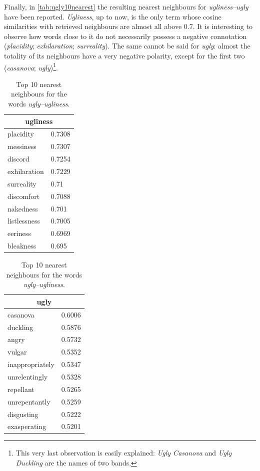 Finally, in \autoref{tab:ugly10nearest} the resulting nearest neighbours for \emph{ugliness--ugly} have been reported. \emph{Ugliness}, up to now, is the only term whose cosine similarities with retrieved neighbours are almost all above 0.7. It is interesting to observe how words close to it do not necessarily possess a negative connotation (\emph{placidity}; \emph{exhilaration}; \emph{surreality}). The same cannot be said for \emph{ugly}: almost the totality of its neighbours have a very negative polarity, except for the first two (\emph{casanova}; \emph{ugly})\footnote{This very last observation is easily explained: \emph{Ugly Casanova} and \emph{Ugly Duckling} are the names of two bands.}.

\begin{table}[bth]
\myfloatalign
\small
\begin{tabular}{ll}
\toprule
\multicolumn{2}{c}{ugliness}\\ \midrule
placidity & 0.7308\\
messiness & 0.7307\\
discord & 0.7254\\
exhilaration & 0.7229\\
surreality & 0.71\\
discomfort & 0.7088\\
nakedness & 0.701\\
listlessness & 0.7005\\
eeriness & 0.6969\\
bleakness & 0.695\\
\bottomrule
\end{tabular}
\begin{tabular}{ll}
\toprule
\multicolumn{2}{c}{ugly}\\ \midrule
casanova & 0.6006 \\
duckling & 0.5876\\
angry & 0.5732\\
vulgar & 0.5352\\
inappropriately & 0.5347\\
unrelentingly & 0.5328\\
repellant & 0.5265\\
unrepentantly & 0.5259\\
disgusting & 0.5222\\
exasperating & 0.5201\\
\bottomrule
\end{tabular}
\caption[Nearest neighbours for \emph{ugly-ugliness}]{Top 10 nearest neighbours for the words \emph{ugly--ugliness}.}
\label{tab:ugly10nearest}
\end{table}

